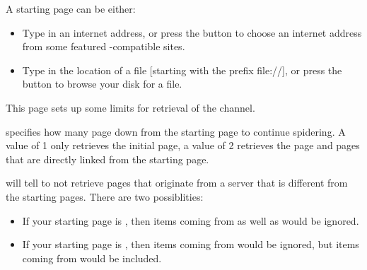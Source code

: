 A starting page can be either:

\begin{itemize}
  \item {} Type in an internet address, or press 
  the  button to choose an internet address 
  from some featured \brandingapplicationsuitename-compatible sites.

  \item {} Type in the location of a file [starting 
  with the prefix file://], or press the  button 
  to browse your disk for a file.
\end{itemize}



This page sets up some limits for retrieval of the channel.

 specifies how many page down from the starting
page to continue spidering. A value of 1 only retrieves the initial page, a
value of 2 retrieves the page and pages that are directly linked from the
starting page.

 will tell \brandingapplicationsuitename to not retrieve pages that originate from a 
server that is different from the starting pages. There are two possiblities: 

\begin{itemize}
\item {} If your starting page is
, then items coming from 
 as well as  
would be ignored.

\item {} If your starting page is 
, then items coming from 
 would be ignored, but items coming from 
 would be included.
\end{itemize}

